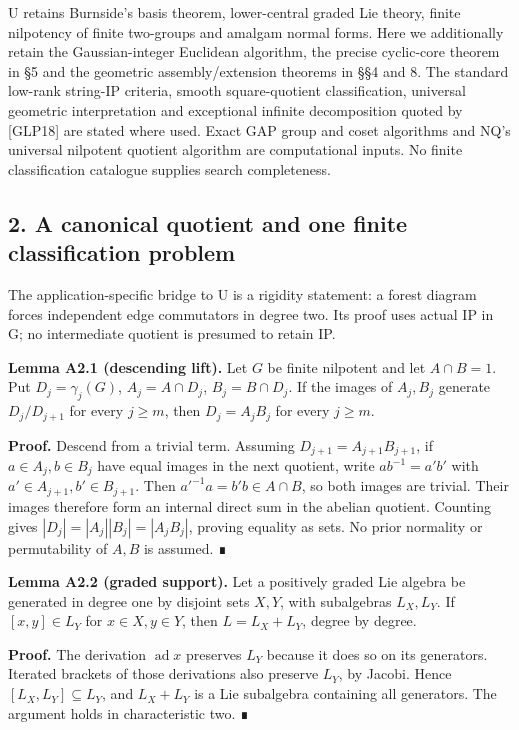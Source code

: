 \documentclass[
  11pt,
  a4paper,
]{article}
\begin{document}
U retains Burnside's basis theorem, lower-central graded Lie theory,
finite nilpotency of finite two-groups and amalgam normal forms. Here we
additionally retain the Gaussian-integer Euclidean algorithm, the
precise cyclic-core theorem in §5 and the geometric assembly/extension
theorems in §§4 and 8. The standard low-rank string-IP criteria, smooth
square-quotient classification, universal geometric interpretation and
exceptional infinite decomposition quoted by {[}GLP18{]} are stated
where used. Exact GAP group and coset algorithms and NQ's universal
nilpotent quotient algorithm are computational inputs. No finite
classification catalogue supplies search completeness.

\subsection{2. A canonical quotient and one finite classification
problem}\label{a-canonical-quotient-and-one-finite-classification-problem}

The application-specific bridge to U is a rigidity statement: a forest
diagram forces independent edge commutators in degree two. Its proof
uses actual IP in G; no intermediate quotient is presumed to retain IP.

\textbf{Lemma A2.1 (descending lift).} Let \(G\) be finite nilpotent and
let \(A\cap B=1\). Put \(D_j=\gamma_j(G)\), \(A_j=A\cap D_j\),
\(B_j=B\cap D_j\). If the images of \(A_j,B_j\) generate \(D_j/D_{j+1}\)
for every \(j\ge m\), then \(D_j=A_jB_j\) for every \(j\ge m\).

\textbf{Proof.} Descend from a trivial term. Assuming
\(D_{j+1}=A_{j+1}B_{j+1}\), if \(a\in A_j,b\in B_j\) have equal images
in the next quotient, write \(ab^{-1}=a'b'\) with
\(a'\in A_{j+1},b'\in B_{j+1}\). Then \(a'^{-1}a=b'b\in A\cap B\), so
both images are trivial. Their images therefore form an internal direct
sum in the abelian quotient. Counting gives
\(|D_j|=|A_j||B_j|=|A_jB_j|\), proving equality as sets. No prior
normality or permutability of \(A,B\) is assumed. ∎

\textbf{Lemma A2.2 (graded support).} Let a positively graded Lie
algebra be generated in degree one by disjoint sets \(X,Y\), with
subalgebras \(L_X,L_Y\). If \([x,y]\in L_Y\) for \(x\in X,y\in Y\), then
\(L=L_X+L_Y\), degree by degree.

\textbf{Proof.} The derivation \(\operatorname{ad}x\) preserves \(L_Y\)
because it does so on its generators. Iterated brackets of those
derivations also preserve \(L_Y\), by Jacobi. Hence
\([L_X,L_Y]\subseteq L_Y\), and \(L_X+L_Y\) is a Lie subalgebra
containing all generators. The argument holds in characteristic two. ∎
\end{document}
